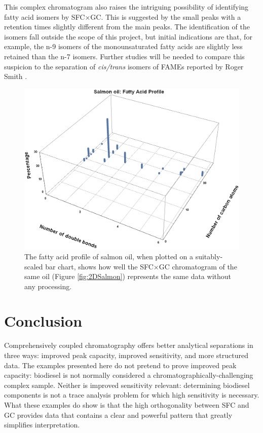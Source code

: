 This complex chromatogram also raises the intriguing possibility of identifying
fatty acid isomers by SFC×GC. This is suggested by the small peaks with a \oneD
retention times slightly different from the main peaks. The identification of
the isomers fall outside the scope of this project, but initial indications are
that, for example, the n-9 isomers of the monounsaturated fatty acids are
slightly less retained than the n-7 isomers. Further studies will be needed to
compare this suspicion to the separation of \textit{cis/trans} isomers of FAMEs
reported by Roger Smith \autocite{Smith2001}.

\begin{figure}
\centering
\includegraphics[width=\textwidth]{Figures/SalmonBarChart.png}
\decoRule

\caption[3D Bar chart of salmon oil fatty acid profile]{The fatty acid profile
of salmon oil, when plotted on a suitably-scaled bar chart, shows how well the
SFC×GC chromatogram of the same oil (Figure \ref{fig:2DSalmon}) represents
the same data without any processing.}

\label{fig:2DSalmonBarChart}
\end{figure}

\section{Conclusion}

Comprehensively coupled chromatography offers better analytical separations in
three ways: improved peak capacity, improved sensitivity, and more structured
data. The examples presented here do not pretend to prove improved peak
capacity: biodiesel is not normally considered a chromatographically-challenging
complex sample. Neither is improved sensitivity relevant: determining biodiesel
components is not a trace analysis problem for which high sensitivity is
necessary. What these examples do show is that the high orthogonality between
SFC and GC provides data that contains a clear and powerful pattern that greatly
simplifies interpretation.

